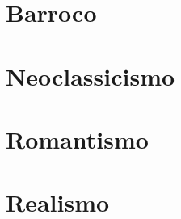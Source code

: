 \documentclass[12pt,fleqn]{book}
\begin{document}
\part{Barroco}




\part{Neoclassicismo}





\part{Romantismo}





\part{Realismo}


\end{document}
